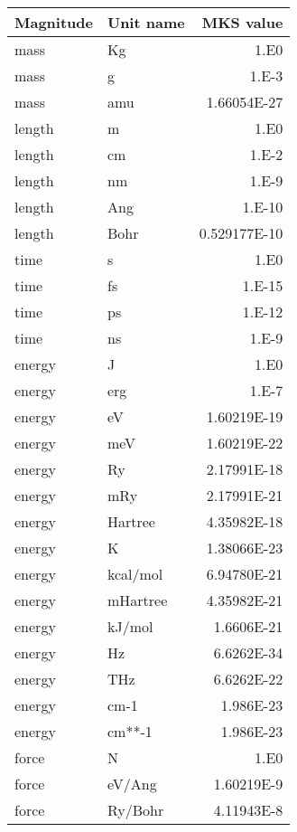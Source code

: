 \begin{center}
\begin{tabular}{llr}
Magnitude & Unit name & MKS value \\
\hline  
mass     & Kg         & 1.E0 \\
mass     & g          & 1.E-3 \\
mass     & amu        & 1.66054E-27 \\
length   & m          & 1.E0 \\
length   & cm         & 1.E-2 \\
length   & nm         & 1.E-9 \\
length   & Ang        & 1.E-10 \\
length   & Bohr       & 0.529177E-10 \\
time     & s          & 1.E0 \\
time     & fs         & 1.E-15 \\
time     & ps         & 1.E-12 \\
time     & ns         & 1.E-9 \\
energy   & J          & 1.E0 \\
energy   & erg        & 1.E-7 \\
energy   & eV         & 1.60219E-19 \\
energy   & meV        & 1.60219E-22 \\
energy   & Ry         & 2.17991E-18 \\
energy   & mRy        & 2.17991E-21 \\
energy   & Hartree    & 4.35982E-18 \\
energy   & K          & 1.38066E-23 \\
energy   & kcal/mol   & 6.94780E-21 \\
energy   & mHartree   & 4.35982E-21 \\
energy   & kJ/mol     & 1.6606E-21 \\
energy   & Hz         & 6.6262E-34 \\
energy   & THz        & 6.6262E-22 \\
energy   & cm-1       & 1.986E-23 \\
energy   & cm**-1     & 1.986E-23 \\
force    & N          & 1.E0 \\
force    & eV/Ang     & 1.60219E-9 \\
force    & Ry/Bohr    & 4.11943E-8 \\
\hline
\end{tabular}


\end{center}
